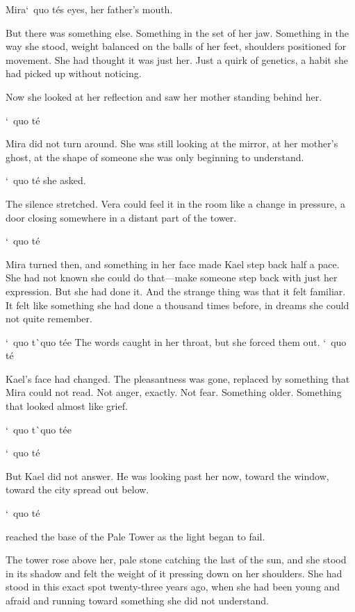 \documentclass[12pt,letterpaper,openany]{book}
\begin{document}
Mira`\ quo t\'e{}s eyes, her father's mouth.
\par
But there was something else. Something in the set of her jaw. Something in the way she stood, weight balanced on the balls of her feet, shoulders positioned for movement. She had thought it was just her. Just a quirk of genetics, a habit she had picked up without noticing.
\par
Now she looked at her reflection and saw her mother standing behind her.
\par
\hrulefill`\ quo t\'e{}
\par
Mira did not turn around. She was still looking at the mirror, at her mother's ghost, at the shape of someone she was only beginning to understand.
\par
`\ quo t\'e{} she asked.
\par
The silence stretched. Vera could feel it in the room like a change in pressure, a door closing somewhere in a distant part of the tower.
\par
`\ quo t\'e{}
\par
Mira turned then, and something in her face made Kael step back half a pace. She had not known she could do that—make someone step back with just her expression. But she had done it. And the strange thing was that it felt familiar. It felt like something she had done a thousand times before, in dreams she could not quite remember.
\par
`\ quo t\`\ quo t\'e{}e{} The words caught in her throat, but she forced them out. `\ quo t\'e{}
\par
Kael's face had changed. The pleasantness was gone, replaced by something that Mira could not read. Not anger, exactly. Not fear. Something older. Something that looked almost like grief.
\par
`\ quo t\`\ quo t\'e{}e{}
\par
`\ quo t\'e{}
\par
But Kael did not answer. He was looking past her now, toward the window, toward the city spread out below.
\par
`\ quo t\'e{}
\par
\hrulefillVera reached the base of the Pale Tower as the light began to fail.
\par
The tower rose above her, pale stone catching the last of the sun, and she stood in its shadow and felt the weight of it pressing down on her shoulders. She had stood in this exact spot twenty-three years ago, when she had been young and afraid and running toward something she did not understand.
\end{document}
